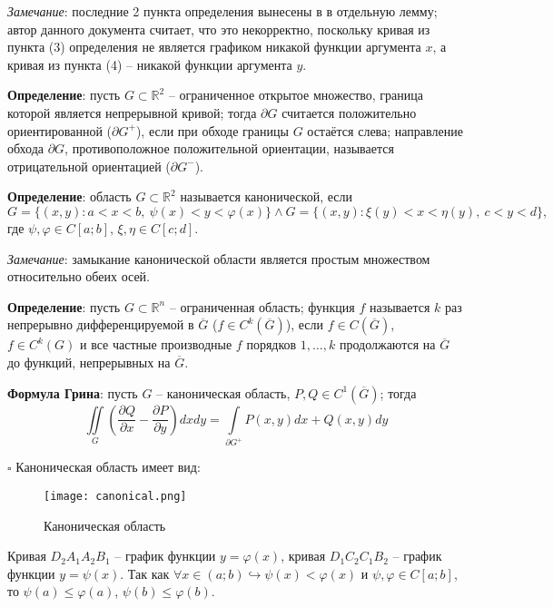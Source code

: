 \documentclass[12pt, a4paper, reqno]{article}
\begin{document}
    \textit{Замечание}: последние 2 пункта определения вынесены в \cite{petrovich-3} в отдельную
    лемму; автор данного документа считает, что это некорректно, поскольку кривая из пункта (3)
    определения не является графиком никакой функции аргумента $x$, а кривая из пункта (4) -- никакой
    функции аргумента $y$.

    \textbf{Определение}: пусть $G \subset \mathbb{R}^2$ -- ограниченное открытое множество, граница
    которой является непрерывной кривой; тогда $\partial G$ считается положительно ориентированной
    ($\partial G^{+}$), если при обходе границы $G$ остаётся слева; направление обхода $\partial G$,
    противоположное положительной ориентации, называется отрицательной ориентацией ($\partial G^{-}$).

    \textbf{Определение}: область $G \subset \mathbb{R}^2$ называется канонической, если
    \begin{equation*}
        G = \{(x, y): a < x < b,\ \psi(x) < y < \varphi(x)\} \wedge
        G = \{(x, y): \xi(y) < x < \eta(y),\ c < y < d\},
    \end{equation*}
    где $\psi, \varphi \in C[a; b]$, $\xi, \eta \in C[c; d]$.

    \textit{Замечание}: замыкание канонической области является простым множеством относительно
    обеих осей.

    \textbf{Определение}: пусть $G \subset \mathbb{R}^n$ -- ограниченная область; функция $f$
    называется $k$ раз непрерывно дифференцируемой в $\overline{G}$ ($f \in C^k(\overline{G})$),
    если $f \in C(\overline{G})$, $f \in C^k(G)$ и все частные производные $f$ порядков $1, \ldots, k$
    продолжаются на $\overline{G}$ до функций, непрерывных на $\overline{G}$.

    \textbf{Формула Грина}: пусть $G$ -- каноническая область, $P, Q \in C^1(\overline{G})$; тогда
    \begin{equation*}
        \iint\limits_{G} \left(\frac{\partial Q}{\partial x} - \frac{\partial P}{\partial y}\right)dxdy =
        \int\limits_{\partial G^{+}} P(x, y)dx + Q(x, y)dy
    \end{equation*}

    $\square$
    Каноническая область имеет вид:
    \begin{figure}[H]
        \centering
        \texttt{[image: canonical.png]}
        \caption{Каноническая область}
    \end{figure}

    Кривая $D_2A_1A_2B_1$ -- график функции $y = \varphi(x)$, кривая $D_1C_2C_1B_2$ -- график
    функции $y = \psi(x)$. Так как $\forall x \in (a; b) \hookrightarrow \psi(x) < \varphi(x)$ и
    $\psi, \varphi \in C[a; b]$, то $\psi(a) \leq \varphi(a)$, $\psi(b) \leq \varphi(b)$.
\end{document}

